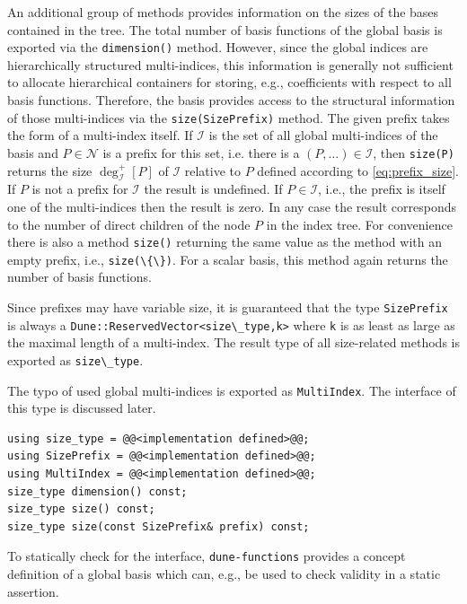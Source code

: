 \documentclass[a4paper,10pt,headings=normal,bibliography=totoc]{scrartcl}
\newcommand{\cpp}[1]{\lstinline[basicstyle=\ttfamily]!#1!}
\newcommand{\dunemodule}[1]{\texttt{#1}}
\begin{document}
An additional group of methods provides information on the sizes of the bases
contained in the tree.
The total number of basis functions of the global basis is
exported via the \cpp{dimension()} method. However, since
the global indices are hierarchically structured multi-indices,
this information is generally not
sufficient to allocate hierarchical containers for storing,
e.g., coefficients with respect to all basis functions.
Therefore, the basis provides access to the structural
information of those multi-indices via the \cpp{size(SizePrefix)}
method. The given prefix takes the form of a multi-index itself.
If $\mathcal{I}$ is the set of all global multi-indices of the
basis and $P \in \mathcal{N}$ is a prefix for this set,
i.e. there is a $(P,\dots) \in \mathcal{I}$, then
\cpp{size(P)} returns the size $\operatorname{deg}^+_{\mathcal{I}}[P]$ of
$\mathcal{I}$ relative to $P$ defined according to \eqref{eq:prefix_size}.
If $P$ is not a prefix for $\mathcal{I}$ the result is undefined.
If $P \in \mathcal{I}$, i.e., the prefix is itself one of the multi-indices
then the result is zero.
In any case the result corresponds to the number of direct children
of the node $P$ in the index tree.
For convenience there is also a method \cpp{size()} returning the same
value as the method with an empty prefix, i.e., \cpp{size(\{\})}.
For a scalar basis, this method again returns the number of basis functions.

Since prefixes may have variable size, it is guaranteed that the type \cpp{SizePrefix}
is always a \cpp{Dune::ReservedVector<size\_type,k>} where \cpp{k}
is as least as large as the maximal length of a multi-index. The result
type of all size-related methods is exported as \cpp{size\_type}.

The typo of used global multi-indices is exported as \cpp{MultiIndex}.
The interface of this type is discussed later.

\begin{lstlisting}[style=Interface]
using size_type = @@<implementation defined>@@;
using SizePrefix = @@<implementation defined>@@;
using MultiIndex = @@<implementation defined>@@;
size_type dimension() const;
size_type size() const;
size_type size(const SizePrefix& prefix) const;
\end{lstlisting}



To statically check for the interface,
\dunemodule{dune-functions} provides a concept definition of a global
basis which can, e.g., be used to check validity in a static assertion.
\end{document}
